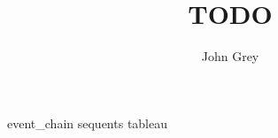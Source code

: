 \documentclass[12pt]{book}
\title{TODO}
\author{John Grey}
\begin{document}
\frontmatter
\maketitle
\tableofcontents

\mainmatter
\setlength{\parskip}{1.5em}

{event_chain}
{sequents}
{tableau}

\nocite{*}
% 
% 
\end{document}
